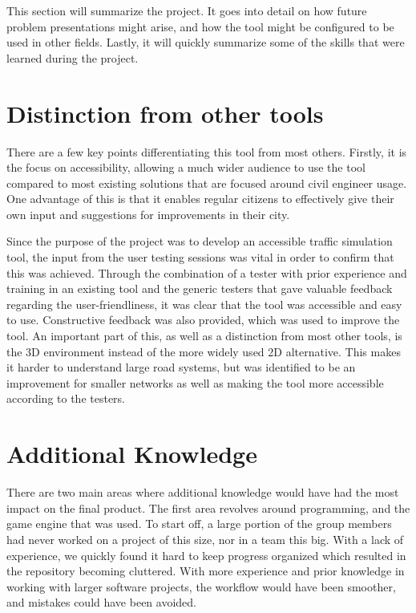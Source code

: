 This section will summarize the project. It goes into detail on how future problem presentations might arise, and how the tool might be configured to be used in other fields. Lastly, it will quickly summarize some of the skills that were learned during the project.

    \section{Distinction from other tools}
        There are a few key points differentiating this tool from most others. Firstly, it is the focus on accessibility, allowing a much wider audience to use the tool compared to most existing solutions that are focused around civil engineer usage. One advantage of this is that it enables regular citizens to effectively give their own input and suggestions for improvements in their city.

        Since the purpose of the project was to develop an accessible traffic simulation tool, the input from the user testing sessions was vital in order to confirm that this was achieved. Through the combination of a tester with prior experience and training in an existing tool and the generic testers that gave valuable feedback regarding the user-friendliness, it was clear that the tool was accessible and easy to use. Constructive feedback was also provided, which was used to improve the tool. An important part of this, as well as a distinction from most other tools, is the 3D environment instead of the more widely used 2D alternative. This makes it harder to understand large road systems, but was identified to be an improvement for smaller networks as well as making the tool more accessible according to the testers.

    \section{Additional Knowledge}
        There are two main areas where additional knowledge would have had the most impact on the final product. The first area revolves around programming, and the game engine that was used. To start off, a large portion of the group members had never worked on a project of this size, nor in a team this big. With a lack of experience, we quickly found it hard to keep progress organized which resulted in the repository becoming cluttered. With more experience and prior knowledge in working with larger software projects, the workflow would have been smoother, and mistakes could have been avoided.

